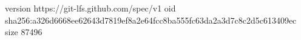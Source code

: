 version https://git-lfs.github.com/spec/v1
oid sha256:a326d6668ee62643d7819ef8a2e64fcc8ba555fc63da2a3d7c8c2d5c613409ec
size 87496
